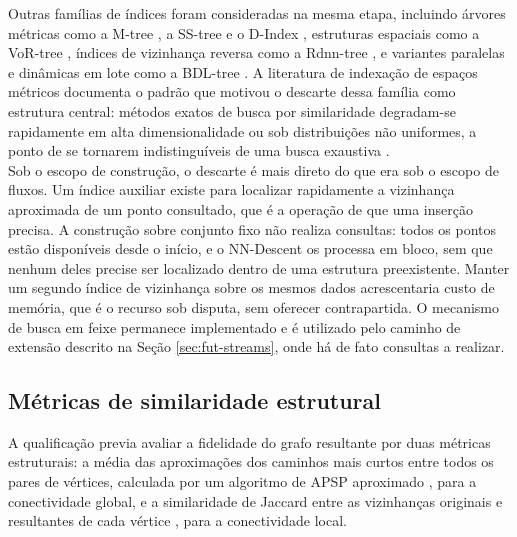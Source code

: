 Outras famílias de índices foram consideradas na mesma etapa, incluindo árvores métricas como a M-tree \cite{mtree}, a SS-tree \cite{sstree} e o D-Index \cite{dindex}, estruturas espaciais como a VoR-tree \cite{vortree}, índices de vizinhança reversa como a Rdnn-tree \cite{rdnntree}, e variantes paralelas e dinâmicas em lote como a BDL-tree \cite{bdl-tree}. A literatura de indexação de espaços métricos \cite{metric-indexing} documenta o padrão que motivou o descarte dessa família como estrutura central: métodos exatos de busca por similaridade degradam-se rapidamente em alta dimensionalidade ou sob distribuições não uniformes, a ponto de se tornarem indistinguíveis de uma busca exaustiva \cite{nearest-neighbor-book}.\\

Sob o escopo de construção, o descarte é mais direto do que era sob o escopo de fluxos. Um índice auxiliar existe para localizar rapidamente a vizinhança aproximada de um ponto consultado, que é a operação de que uma inserção precisa. A construção sobre conjunto fixo não realiza consultas: todos os pontos estão disponíveis desde o início, e o NN-Descent os processa em bloco, sem que nenhum deles precise ser localizado dentro de uma estrutura preexistente. Manter um segundo índice de vizinhança sobre os mesmos dados acrescentaria custo de memória, que é o recurso sob disputa, sem oferecer contrapartida. O mecanismo de busca em feixe permanece implementado e é utilizado pelo caminho de extensão descrito na Seção \ref{sec:fut-streams}, onde há de fato consultas a realizar.\\

\subsection{Métricas de similaridade estrutural\label{sec:discarded-metrics}}

A qualificação previa avaliar a fidelidade do grafo resultante por duas métricas estruturais: a média das aproximações dos caminhos mais curtos entre todos os pares de vértices, calculada por um algoritmo de \ac{APSP} aproximado \cite{apsp}, para a conectividade global, e a similaridade de Jaccard entre as vizinhanças originais e resultantes de cada vértice \cite{jaccard}, para a conectividade local.\\

